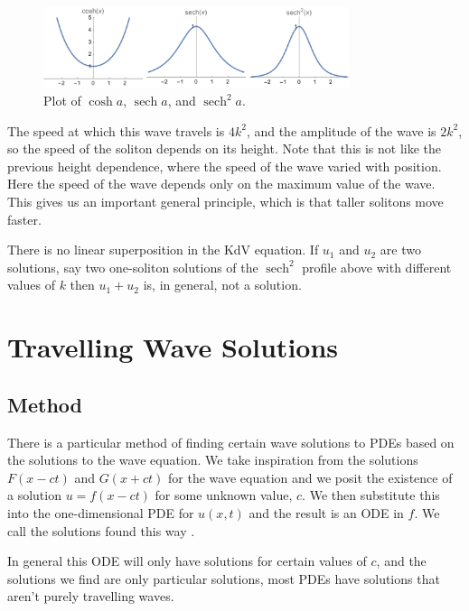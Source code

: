 \documentclass[fleqn]{NotesClass}
\DeclareMathOperator{\sech}{sech}
\begin{document}
    \begin{figure}
        \includegraphics[width=0.8\textwidth]{images/sech}
        \caption[\(\sech^2 a\)]{Plot of \(\cosh a\), \(\sech a\), and \(\sech^2 a\).}
        \label{fig:sech squared}
    \end{figure}
    
    The speed at which this wave travels is \(4k^2\), and the amplitude of the wave is \(2k^2\), so the speed of the soliton depends on its height.
    Note that this is not like the previous height dependence, where the speed of the wave varied with position.
    Here the speed of the wave depends only on the maximum value of the wave.
    This gives us an important general principle, which is that taller solitons move faster.
    
    There is no linear superposition in the KdV equation.
    If \(u_1\) and \(u_2\) are two solutions, say two one-soliton solutions of the \(\sech^2\) profile above with different values of \(k\) then \(u_1 + u_2\) is, in general, not a solution.
    
    \chapter{Travelling Wave Solutions}
    \section{Method}
    There is a particular method of finding certain wave solutions to PDEs based on the solutions to the wave equation.
    We take inspiration from the solutions \(F(x - ct)\) and \(G(x + ct)\) for the wave equation and we posit the existence of a solution \(u = f(x - ct)\) for some unknown value, \(c\).
    We then substitute this into the one-dimensional PDE for \(u(x, t)\) and the result is an ODE in \(f\).
    We call the solutions found this way .
    
    In general this ODE will only have solutions for certain values of \(c\), and the solutions we find are only particular solutions, most PDEs have solutions that aren't purely travelling waves.
    
\end{document}
